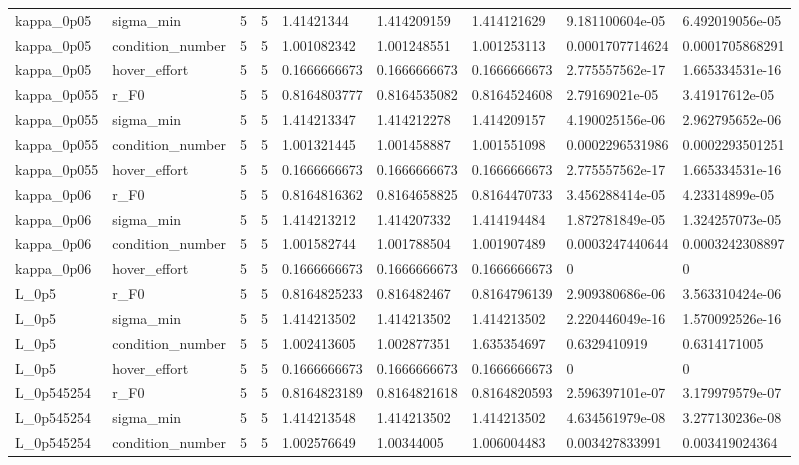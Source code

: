 \begin{tabular}{@{}lllllllll@{}}
kappa\_0p05 & sigma\_min & 5 & 5 & 1.41421344 & 1.414209159 & 1.414121629 & 9.181100604e-05 & 6.492019056e-05 \\
kappa\_0p05 & condition\_number & 5 & 5 & 1.001082342 & 1.001248551 & 1.001253113 & 0.0001707714624 & 0.0001705868291 \\
kappa\_0p05 & hover\_effort & 5 & 5 & 0.1666666673 & 0.1666666673 & 0.1666666673 & 2.775557562e-17 & 1.665334531e-16 \\
kappa\_0p055 & r\_F0 & 5 & 5 & 0.8164803777 & 0.8164535082 & 0.8164524608 & 2.79169021e-05 & 3.41917612e-05 \\
kappa\_0p055 & sigma\_min & 5 & 5 & 1.414213347 & 1.414212278 & 1.414209157 & 4.190025156e-06 & 2.962795652e-06 \\
kappa\_0p055 & condition\_number & 5 & 5 & 1.001321445 & 1.001458887 & 1.001551098 & 0.0002296531986 & 0.0002293501251 \\
kappa\_0p055 & hover\_effort & 5 & 5 & 0.1666666673 & 0.1666666673 & 0.1666666673 & 2.775557562e-17 & 1.665334531e-16 \\
kappa\_0p06 & r\_F0 & 5 & 5 & 0.8164816362 & 0.8164658825 & 0.8164470733 & 3.456288414e-05 & 4.23314899e-05 \\
kappa\_0p06 & sigma\_min & 5 & 5 & 1.414213212 & 1.414207332 & 1.414194484 & 1.872781849e-05 & 1.324257073e-05 \\
kappa\_0p06 & condition\_number & 5 & 5 & 1.001582744 & 1.001788504 & 1.001907489 & 0.0003247440644 & 0.0003242308897 \\
kappa\_0p06 & hover\_effort & 5 & 5 & 0.1666666673 & 0.1666666673 & 0.1666666673 & 0 & 0 \\
L\_0p5 & r\_F0 & 5 & 5 & 0.8164825233 & 0.816482467 & 0.8164796139 & 2.909380686e-06 & 3.563310424e-06 \\
L\_0p5 & sigma\_min & 5 & 5 & 1.414213502 & 1.414213502 & 1.414213502 & 2.220446049e-16 & 1.570092526e-16 \\
L\_0p5 & condition\_number & 5 & 5 & 1.002413605 & 1.002877351 & 1.635354697 & 0.6329410919 & 0.6314171005 \\
L\_0p5 & hover\_effort & 5 & 5 & 0.1666666673 & 0.1666666673 & 0.1666666673 & 0 & 0 \\
L\_0p545254 & r\_F0 & 5 & 5 & 0.8164823189 & 0.8164821618 & 0.8164820593 & 2.596397101e-07 & 3.179979579e-07 \\
L\_0p545254 & sigma\_min & 5 & 5 & 1.414213548 & 1.414213502 & 1.414213502 & 4.634561979e-08 & 3.277130236e-08 \\
L\_0p545254 & condition\_number & 5 & 5 & 1.002576649 & 1.00344005 & 1.006004483 & 0.003427833991 & 0.003419024364 \\

\end{tabular}

